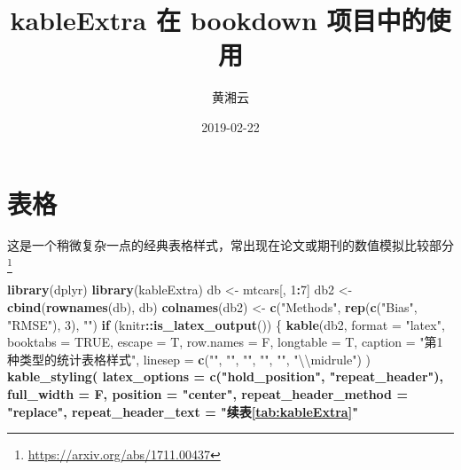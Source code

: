 \documentclass[]{book}
\title{kableExtra 在 bookdown 项目中的使用}
\author{黄湘云}
\date{2019-02-22}
\newenvironment{Shaded}{\begin{snugshade}}{\end{snugshade}}
\newcommand{\CharTok}[1]{\textcolor[rgb]{0.31,0.60,0.02}{#1}}
\newcommand{\ControlFlowTok}[1]{\textcolor[rgb]{0.13,0.29,0.53}{\textbf{#1}}}
\newcommand{\DataTypeTok}[1]{\textcolor[rgb]{0.13,0.29,0.53}{#1}}
\newcommand{\DecValTok}[1]{\textcolor[rgb]{0.00,0.00,0.81}{#1}}
\newcommand{\KeywordTok}[1]{\textcolor[rgb]{0.13,0.29,0.53}{\textbf{#1}}}
\newcommand{\NormalTok}[1]{#1}
\newcommand{\OperatorTok}[1]{\textcolor[rgb]{0.81,0.36,0.00}{\textbf{#1}}}
\newcommand{\OtherTok}[1]{\textcolor[rgb]{0.56,0.35,0.01}{#1}}
\newcommand{\StringTok}[1]{\textcolor[rgb]{0.31,0.60,0.02}{#1}}
\let\rmarkdownfootnote\footnote%
\def\footnote{\protect\rmarkdownfootnote}
\begin{document}
\maketitle

{
\hypersetup{linkcolor=black}
\setcounter{tocdepth}{1}
\tableofcontents
}
\hypertarget{table}{%
\chapter{表格}\label{table}}

这是一个稍微复杂一点的经典表格样式，常出现在论文或期刊的数值模拟比较部分\footnote{\url{https://arxiv.org/abs/1711.00437}}

\begin{Shaded}
\begin{Highlighting}[]
\KeywordTok{library}\NormalTok{(dplyr)}
\KeywordTok{library}\NormalTok{(kableExtra)}
\NormalTok{db <-}\StringTok{ }\NormalTok{mtcars[, }\DecValTok{1}\OperatorTok{:}\DecValTok{7}\NormalTok{]}
\NormalTok{db2 <-}\StringTok{ }\KeywordTok{cbind}\NormalTok{(}\KeywordTok{rownames}\NormalTok{(db), db)}
\KeywordTok{colnames}\NormalTok{(db2) <-}\StringTok{ }\KeywordTok{c}\NormalTok{(}\StringTok{"Methods"}\NormalTok{, }\KeywordTok{rep}\NormalTok{(}\KeywordTok{c}\NormalTok{(}\StringTok{"Bias"}\NormalTok{, }\StringTok{"RMSE"}\NormalTok{), }\DecValTok{3}\NormalTok{), }\StringTok{""}\NormalTok{)}
\ControlFlowTok{if}\NormalTok{ (knitr}\OperatorTok{::}\KeywordTok{is_latex_output}\NormalTok{()) \{}
  \KeywordTok{kable}\NormalTok{(db2,}
    \DataTypeTok{format =} \StringTok{"latex"}\NormalTok{, }\DataTypeTok{booktabs =} \OtherTok{TRUE}\NormalTok{, }\DataTypeTok{escape =}\NormalTok{ T, }\DataTypeTok{row.names =}\NormalTok{ F,}
    \DataTypeTok{longtable =}\NormalTok{ T, }\DataTypeTok{caption =} \StringTok{"第1种类型的统计表格样式"}\NormalTok{,}
    \DataTypeTok{linesep =} \KeywordTok{c}\NormalTok{(}\StringTok{""}\NormalTok{, }\StringTok{""}\NormalTok{, }\StringTok{""}\NormalTok{, }\StringTok{""}\NormalTok{, }\StringTok{""}\NormalTok{, }\StringTok{"}\CharTok{\textbackslash{}\textbackslash{}}\StringTok{midrule"}\NormalTok{)}
\NormalTok{  ) }\OperatorTok{%>%}
\StringTok{    }\KeywordTok{kable_styling}\NormalTok{(}
      \DataTypeTok{latex_options =} \KeywordTok{c}\NormalTok{(}\StringTok{"hold_position"}\NormalTok{, }\StringTok{"repeat_header"}\NormalTok{),}
      \DataTypeTok{full_width =}\NormalTok{ F, }\DataTypeTok{position =} \StringTok{"center"}\NormalTok{, }\DataTypeTok{repeat_header_method =} \StringTok{"replace"}\NormalTok{,}
      \DataTypeTok{repeat_header_text =} \StringTok{"续表\ref{tab:kableExtra}"}
}
\end{Highlighting}
\end{Shaded}
\end{document}
